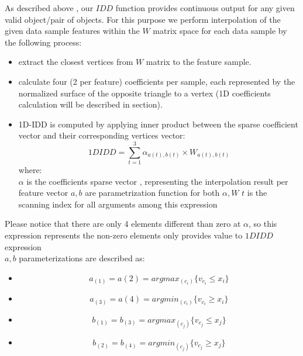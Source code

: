 	As described above , our $IDD$ function provides continuous output for any given valid object/pair of objects. 
	For this purpose we perform interpolation of the given data sample features within the $W$ matrix space for each data sample by the following process:
	\begin{itemize}
		\item extract the closest vertices from $W$ matrix to the feature sample. 
		\item calculate four (2 per feature) coefficients per sample, each represented by the normalized surface of the opposite triangle to a vertex (1D coefficients calculation will be described in section). 
		\item 1D-IDD is computed by applying inner product between the sparse coefficient vector and their corresponding vertices vector:\\
		\begin{equation}
		1DIDD = \sum_{t=1}^{3}\alpha_{a(t),b(t)} \times W_{a(t),b(t)}
		\end{equation}
		where:\\
		$\alpha$ is the coefficients sparse vector , representing the interpolation result per feature vector
		$a , b$ are parametrization function for both $\alpha , W$
		$t$ is the scanning index for all arguments among this expression
	\end{itemize}
		
	Please notice that there are only 4 elements different than zero at $\alpha$, so this expression represents the non-zero elements only provides value to $1DIDD$ expression \\
	
	$a,b$ parameterizations are described as:
	
	\begin{itemize} \label{hypercubes}
		\item	\begin{equation} a_{(1)}=a{(2)} =argmax_{(c_i)} \{ v_{c_i} \leq x_i \} \end{equation}
		\item 	\begin{equation} a_{(3)}=a{(4)} =argmin_{(c_i)} \{ v_{c_i} \geq x_i \}  \end{equation} 
		\item 	\begin{equation} b_{(1)}= b_{(3)} =argmax_{(c_j)} \{ v_{c_j} \leq x_j \}  \end{equation}
		\item 	\begin{equation} b_{(2)}=b_{(4)} =argmin_{(c_j)} \{ v_{c_j} \geq x_j \} \end{equation} 
	\end{itemize}		
	
